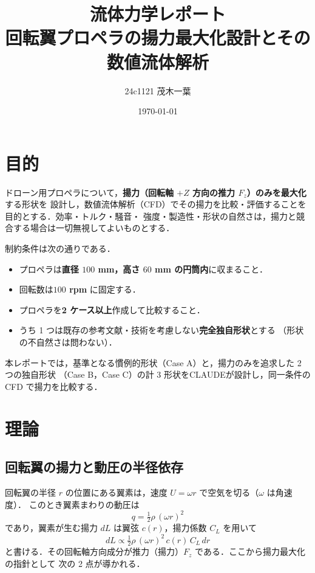 \documentclass[a4paper,11pt]{jsarticle}
\begin{document}
\title{流体力学レポート\\ \large 回転翼プロペラの揚力最大化設計とその数値流体解析}
\author{24c1121 茂木一葉}
\date{\today}
\maketitle

\section{目的}

ドローン用プロペラについて，\textbf{揚力（回転軸 $+Z$ 方向の推力 $F_z$）のみを最大化}する形状を
設計し，数値流体解析（CFD）でその揚力を比較・評価することを目的とする．効率・トルク・騒音・
強度・製造性・形状の自然さは，揚力と競合する場合は一切無視してよいものとする．

制約条件は次の通りである．

\begin{itemize}
  \item プロペラは\textbf{直径 $100$ mm，高さ $60$ mm の円筒内}に収まること．
  \item 回転数は\textbf{$100$ rpm} に固定する．
  \item プロペラを\textbf{2 ケース以上}作成して比較すること．
  \item うち 1 つは既存の参考文献・技術を考慮しない\textbf{完全独自形状}とする
        （形状の不自然さは問わない）．
\end{itemize}

本レポートでは，基準となる慣例的形状（Case A）と，揚力のみを追求した 2 つの独自形状
（Case B，Case C）の計 3 形状をCLAUDEが設計し，同一条件の CFD で揚力を比較する．

\section{理論}

\subsection{回転翼の揚力と動圧の半径依存}

回転翼の半径 $r$ の位置にある翼素は，速度 $U=\omega r$ で空気を切る（$\omega$ は角速度）．
このとき翼素まわりの動圧は
\begin{equation}
  q=\tfrac{1}{2}\rho\,(\omega r)^2
\end{equation}
であり，翼素が生む揚力 $dL$ は翼弦 $c(r)$，揚力係数 $C_L$ を用いて
\begin{equation}
  dL \propto \tfrac{1}{2}\rho\,(\omega r)^2\,c(r)\,C_L\,dr
\end{equation}
と書ける．その回転軸方向成分が推力（揚力）$F_z$ である．ここから揚力最大化の指針として
次の 2 点が導かれる．
\end{document}
